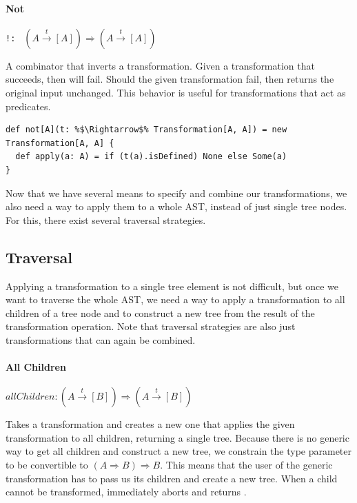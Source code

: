 \paragraph{Not} \hfill \lstinline{!: } $(A \overset{t}{\rightarrow} [A]) \Rightarrow (A \overset{t}{\rightarrow} [A])$

\vspace{7pt} A combinator that inverts a transformation. Given a transformation that succeeds, then  will fail. Should the given transformation fail, then  returns the original input unchanged. This behavior is useful for transformations that act as predicates.

\begin{lstlisting}
def not[A](t: %$\Rightarrow$% Transformation[A, A]) = new Transformation[A, A] {
  def apply(a: A) = if (t(a).isDefined) None else Some(a)
}
\end{lstlisting}

Now that we have several means to specify and combine our transformations, we also need a way to apply them to a whole AST, instead of just single tree nodes. For this, there exist several traversal strategies.

\subsection{Traversal}

Applying a transformation to a single tree element is not difficult, but once we want to traverse the whole AST, we need a way to apply a transformation to all children of a tree node and to construct a new tree from the result of the transformation operation. Note that traversal strategies are also just transformations that can again be combined.

\paragraph{All Children} \hfill  $allChildren: (A \overset{t}{\rightarrow} [B]) \Rightarrow (A \overset{t}{\rightarrow} [B])$

\vspace{7pt} Takes a transformation and creates a new one that applies the given transformation to all children, returning a single tree. Because there is no generic way to get all children and construct a new tree, we constrain the type parameter  to be convertible to $(A \Rightarrow B) \Rightarrow B$. This means that the user of the generic transformation has to pass us its children and create a new tree. When a child cannot be transformed,  immediately aborts and returns .

